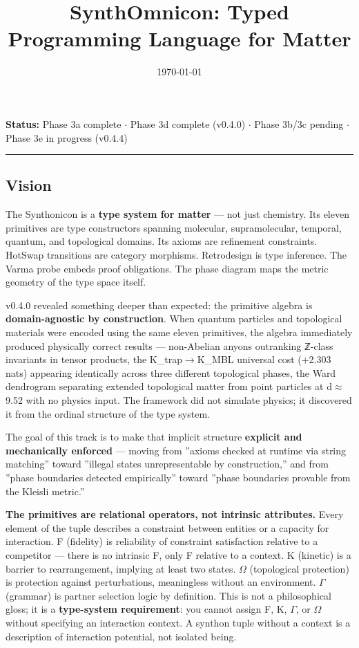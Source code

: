 \documentclass[12pt,a4paper]{article}
\begin{document}
\title{SynthOmnicon: Typed Programming Language for Matter}
\date{\today}

\maketitle

\textbf{Status:} Phase 3a complete $\cdot$ Phase 3d complete (v0.4.0) $\cdot$ Phase 3b/3c pending $\cdot$ Phase 3e in progress (v0.4.4)

\begin{center}
\rule{0.5\textwidth}{0.4pt}
\end{center}

\subsection{Vision}

The Synthonicon is a \textbf{type system for matter} --- not just chemistry. Its eleven primitives are type constructors spanning molecular, supramolecular, temporal, quantum, and topological domains. Its axioms are refinement constraints. HotSwap transitions are category morphisms. Retrodesign is type inference. The Varma probe embeds proof obligations. The phase diagram maps the metric geometry of the type space itself.

v0.4.0 revealed something deeper than expected: the primitive algebra is \textbf{domain-agnostic by construction}. When quantum particles and topological materials were encoded using the same eleven primitives, the algebra immediately produced physically correct results --- non-Abelian anyons outranking ℤ-class invariants in tensor products, the K\_trap$\rightarrow$K\_MBL universal cost (+2.303 nats) appearing identically across three different topological phases, the Ward dendrogram separating extended topological matter from point particles at d$\approx$9.52 with no physics input. The framework did not simulate physics; it discovered it from the ordinal structure of the type system.

The goal of this track is to make that implicit structure \textbf{explicit and mechanically enforced} --- moving from ''axioms checked at runtime via string matching'' toward ''illegal states unrepresentable by construction,'' and from ''phase boundaries detected empirically'' toward ''phase boundaries provable from the Kleisli metric.''

\textbf{The primitives are relational operators, not intrinsic attributes.} Every element of the tuple describes a constraint between entities or a capacity for interaction. F (fidelity) is reliability of constraint satisfaction relative to a competitor --- there is no intrinsic F, only F relative to a context. K (kinetic) is a barrier to rearrangement, implying at least two states. $\Omega$ (topological protection) is protection against perturbations, meaningless without an environment. $\Gamma$ (grammar) is partner selection logic by definition. This is not a philosophical gloss; it is a \textbf{type-system requirement}: you cannot assign F, K, $\Gamma$, or $\Omega$ without specifying an interaction context. A synthon tuple without a context is a description of interaction potential, not isolated being.
\end{document}
